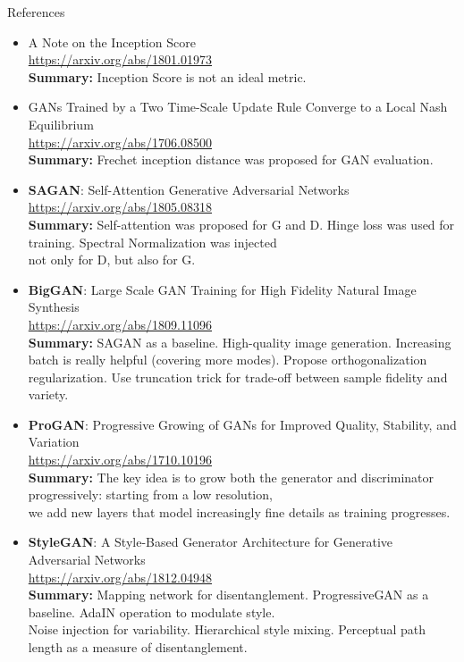 \documentclass{beamer}
\begin{document}
\begin{frame}{References}
{\tiny
\begin{itemize}
	
	\item A Note on the Inception Score \\
	\href{https://arxiv.org/abs/1801.01973}{https://arxiv.org/abs/1801.01973} \\
	\textbf{Summary:} Inception Score is not an ideal metric.
	
	\item GANs Trained by a Two Time-Scale Update Rule Converge to a Local Nash Equilibrium \\
	\href{https://arxiv.org/abs/1706.08500}{https://arxiv.org/abs/1706.08500} \\
	\textbf{Summary:} Frechet inception distance was proposed for GAN evaluation.
	
	\item \textbf{SAGAN}: Self-Attention Generative Adversarial Networks \\
	\href{https://arxiv.org/abs/1805.08318}{https://arxiv.org/abs/1805.08318} \\
	\textbf{Summary:} Self-attention was proposed for G and D. Hinge loss was used for training. Spectral Normalization was injected \\
	not only for D, but also for G. 
	
	\item \textbf{BigGAN}: Large Scale GAN Training for High Fidelity Natural Image Synthesis \\
	\href{https://arxiv.org/abs/1809.11096}{https://arxiv.org/abs/1809.11096} \\
	\textbf{Summary:} SAGAN as a baseline. High-quality image generation. Increasing batch is really helpful (covering more modes). Propose orthogonalization regularization. Use truncation trick for trade-off between sample fidelity and variety.
	
	\item \textbf{ProGAN}: Progressive Growing of GANs for Improved Quality, Stability, and Variation \\
	\href{https://arxiv.org/abs/1710.10196}{https://arxiv.org/abs/1710.10196} \\
	\textbf{Summary:} The key idea is to grow both the generator and discriminator progressively: starting from a low resolution, \\
	we add new layers that model increasingly fine details as training progresses.
	
	\item \textbf{StyleGAN}: A Style-Based Generator Architecture for Generative Adversarial Networks  \\
	\href{https://arxiv.org/abs/1812.04948}{https://arxiv.org/abs/1812.04948} \\
	\textbf{Summary:} Mapping network for disentanglement. ProgressiveGAN as a baseline. AdaIN operation to modulate style. \\
	Noise injection for variability. Hierarchical style mixing. Perceptual path length as a measure of disentanglement.
\end{itemize}
}
\end{frame}
\end{document}
